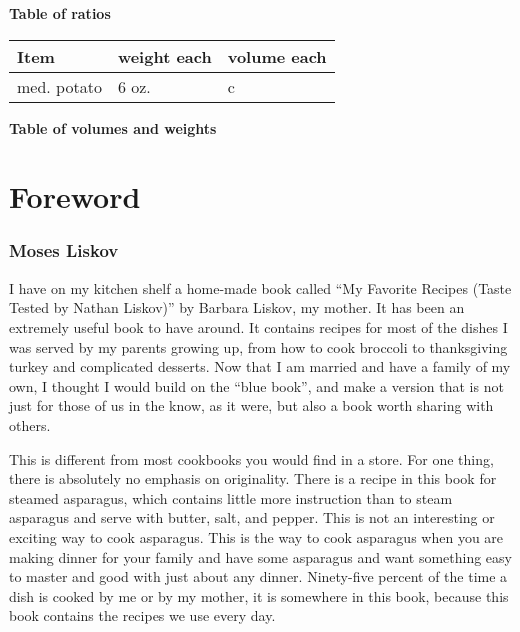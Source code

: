 \documentclass[8pt]{report}
\newcommand{\fr}[2]{\nicefrac{#1}{#2}}
\begin{document}
\begin{center}
\begin{tabular}{|l|cccccc|}
\end{tabular}

\textbf{Table of ratios}

\vspace{1cm}

\begin{tabular}{|l|ll|} \hline
Item & weight each & volume each \\ \hline
med. potato & 6 oz. & \fr34 c \\
\hline
\end{tabular}

\textbf{Table of volumes and weights}

\end{center}

\tableofcontents
{}

 \chapter*{Foreword}
\subsection*{Moses Liskov}


I have on my kitchen shelf a home-made book called ``My Favorite Recipes (Taste Tested by Nathan Liskov)'' by Barbara Liskov, my mother.  It has been an extremely useful book to have around.  It contains recipes for most of the dishes I was served by my parents growing up, from how to cook broccoli to thanksgiving turkey and complicated desserts.  Now that I am married and have a family of my own, I thought I would build on the ``blue book'', and make a version that is not just for those of us in the know, as it were, but also a book worth sharing with others.

This is different from most cookbooks you would find in a store.  For one thing, there is absolutely no emphasis on originality.  There is a recipe in this book for steamed asparagus, which contains little more instruction than to steam asparagus and serve with butter, salt, and pepper.  This is not an interesting or exciting way to cook asparagus.  This is the way to cook asparagus when you are making dinner for your family and have some asparagus and want something easy to master and good with just about any dinner.  Ninety-five percent of the time a dish is cooked by me or by my mother, it is somewhere in this book, because this book contains the recipes we use every day.
\end{document}
